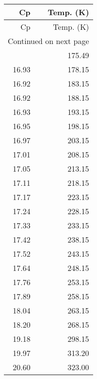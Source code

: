\begin{longtable}{rr}
\toprule
   Cp &  Temp. (K) \\
\midrule
\endfirsthead

\toprule
   Cp &  Temp. (K) \\
\midrule
\endhead
\midrule
\multicolumn{2}{r}{{Continued on next page}} \\
\midrule
\endfoot

\bottomrule
\endlastfoot
16.94 &     175.49 \\
16.93 &     178.15 \\
16.92 &     183.15 \\
16.92 &     188.15 \\
16.93 &     193.15 \\
16.95 &     198.15 \\
16.97 &     203.15 \\
17.01 &     208.15 \\
17.05 &     213.15 \\
17.11 &     218.15 \\
17.17 &     223.15 \\
17.24 &     228.15 \\
17.33 &     233.15 \\
17.42 &     238.15 \\
17.52 &     243.15 \\
17.64 &     248.15 \\
17.76 &     253.15 \\
17.89 &     258.15 \\
18.04 &     263.15 \\
18.20 &     268.15 \\
19.18 &     298.15 \\
19.97 &     313.20 \\
20.60 &     323.00 \\
\end{longtable}

